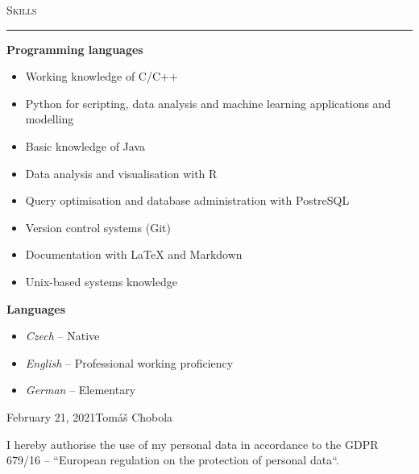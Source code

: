 \documentclass[10pt]{article}
\begin{document}
\begin{Large}
    \textsc{Skills}
    \vspace{0.4em}
    \hrule
    \vspace{0.4em}
\end{Large}
\begin{normalsize}
    \textbf{Programming languages}
    \begin{itemize}\itemsep -2pt %
        \item Working knowledge of C/C++
        \item Python for scripting, data analysis and machine learning applications and modelling
        \item Basic knowledge of Java
        \item Data analysis and visualisation with R
        \item Query optimisation and database administration with PostreSQL
        \item Version control systems (Git)
        \item Documentation with LaTeX and Markdown
        \item Unix-based systems knowledge
    \end{itemize}
    
    \textbf{Languages}
    \begin{itemize}\itemsep -2pt %
        \item \textit{Czech} -- Native
        \item \textit{English} -- Professional working proficiency
        \item \textit{German} -- Elementary
    \end{itemize}
\end{normalsize}


\vspace{290pt}
\hfill February 21, 2021\hspace{1cm}Tomáš Chobola
\vspace{10pt}

I hereby authorise the use of my personal data in accordance to the GDPR 679/16 – “European regulation on the protection of personal data``.
\end{document}
